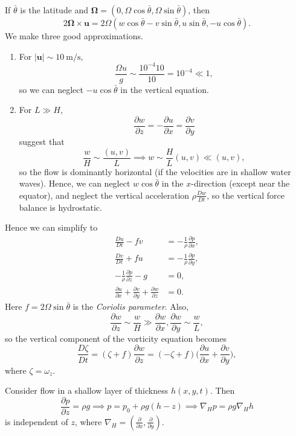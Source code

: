 \documentclass[12pt]{article}
\begin{document}
If $\bar \theta$ is the latitude and $\bm{\Omega} = (0, \Omega \cos \bar \theta, \Omega \sin \bar \theta)$, then
\[
2 \bm{\Omega} \times \mathbf{u} = 2 \Omega (w \cos \bar \theta - v \sin \bar \theta, u \sin \bar \theta, - u \cos \bar \theta).
\]
We make three good approximations.
\begin{enumerate}
	\item For $|\mathbf{u}| \sim \qty{10}{\metre \per \second}$,
		\[
		\frac{\Omega u}{g} \sim \frac{10^{-4} 10}{10} = 10^{-4} \ll 1,
		\]
		so we can neglect $- u \cos \bar \theta$ in the vertical equation.
	\item For $L \gg H$,
		\[
		\frac{\partial w}{\partial z} = - \frac{\partial u}{\partial x} = \frac{\partial v}{\partial y}
		\]
		suggest that
		\[
		\frac{w}{H} \sim \frac{(u, v)}{L} \implies w \sim \frac{H}{L}(u, v) \ll (u, v),
		\]
		so the flow is dominantly horizontal (if the velocities are in shallow water waves). Hence, we can neglect $w \cos \bar \theta$ in the $x$-direction (except near the equator), and neglect the vertical acceleration $\rho \frac{D w}{D t}$, so the vertical force balance is hydrostatic.
\end{enumerate}
Hence we can simplify to
\begin{align*}
	\frac{Du}{Dt} - fv &= - \frac{1}{\rho} \frac{\partial p}{\partial x}, \\
	\frac{Dv}{Dt} + fu &= - \frac{1}{\rho} \frac{\partial p}{\partial y}, \\
	- \frac{1}{\rho} \frac{\partial p}{\partial z} - g &= 0, \\
	\frac{\partial u}{\partial x} + \frac{\partial v}{\partial y} + \frac{\partial w}{\partial z} &= 0.
\end{align*}
Here $f = 2 \Omega \sin \bar \theta$ is the \emph{Coriolis parameter}. Also,
\[
\frac{\partial w}{\partial z} \sim \frac{w}{H} \gg \frac{\partial w}{\partial x}, \frac{\partial w}{\partial y} \sim \frac{w}{L},
\]
so the vertical component of the vorticity equation becomes
\[
	\frac{D \zeta}{D t} = (\zeta + f) \frac{\partial w}{\partial z} = (- \zeta + f)\biggl( \frac{\partial u}{\partial x} + \frac{\partial v}{\partial y} \biggr),
\]
where $\zeta = \omega_z$.

Consider flow in a shallow layer of thickness $h(x, y, t)$. Then
\[
\frac{\partial p}{\partial z} = \rho g \implies p = p_0 + \rho g(h - z) \implies \nabla_H p = \rho g \nabla_H h
\]
is independent of $z$, where $\nabla_H = ( \frac{\partial}{\partial x}, \frac{\partial}{\partial y} )$.
\end{document}
